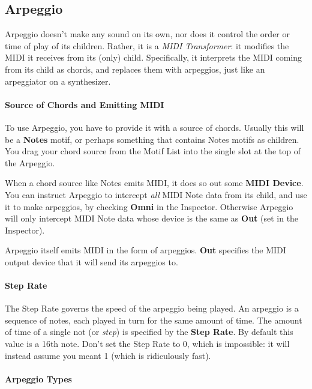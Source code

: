 \documentclass[twoside,10pt]{article}
\begin{document}
\subsection{Arpeggio}

Arpeggio doesn't make any sound on its own, nor does it control the order or time of play of its children.  Rather, it is a {\it MIDI Transformer}: it modifies the MIDI it receives from its (only) child.  Specifically, it interprets the MIDI coming from its child as chords, and replaces them with arpeggios, just like an arpeggiator on a synthesizer.

\paragraph{Source of Chords and Emitting MIDI}

To use Arpeggio, you have to provide it with a source of chords.  Usually this will be a {\bf Notes} motif, or perhaps something that contains Notes motifs as children.  You drag your chord source from the Motif List into the single slot at the top of the Arpeggio.

When a chord source like Notes emits MIDI, it does so out some {\bf MIDI Device}.  You can instruct Arpeggio to intercept {\it all} MIDI Note data from its child, and use it to make arpeggios, by checking {\bf Omni} in the Inspector.  Otherwise Arpeggio will only intercept MIDI Note data whose device is the same as {\bf Out} (set in the Inspector).

Arpeggio itself emits MIDI in the form of arpeggios. {\bf Out} specifies the MIDI output device that it will send its arpeggios to.

\paragraph{Step Rate}

The Step Rate governs the speed of the arpeggio being played.  An arpeggio is a sequence of notes, each played in turn for the same amount of time.  The amount of time of a single not (or {\it step}) is specified by the {\bf Step Rate}.  By default this value is a 16th note.  Don't set the Step Rate to 0, which is impossible: it will instead assume you meant 1 (which is ridiculously fast).


\paragraph{Arpeggio Types}
\end{document}
